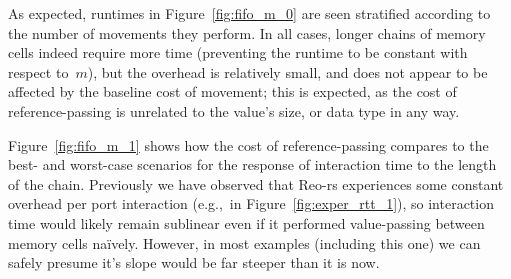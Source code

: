 As expected, runtimes in Figure~\ref{fig:fifo_m_0} are seen stratified according to the number of movements they perform. In all cases, longer chains of memory cells indeed require more time (preventing the runtime to be constant with respect to~$m$), but the overhead is relatively small, and does not appear to be affected by the baseline cost of movement; this is expected, as the cost of reference-passing is unrelated to the value's size, or data type in any way.

Figure~\ref{fig:fifo_m_1} shows how the cost of reference-passing compares to the best- and worst-case scenarios for the response of interaction time to the length of the chain. Previously we have observed that Reo-rs experiences some constant overhead per port interaction (e.g.,\ in Figure~\ref{fig:exper_rtt_1}), so interaction time would likely remain sublinear even if it performed value-passing between memory cells na\"ively. However, in most examples (including this one) we can safely presume it's slope would be far steeper than it is now.

